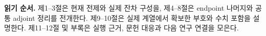 \documentclass[11pt,a4paper]{article}
\theoremstyle{definition}\newtheorem{definition}{정의}
\begin{document}
\noindent{}
\newpage
\begingroup\small\setlength{\parskip}{0pt}
\tableofcontents
\vspace{3mm}
\noindent\textbf{읽기 순서.} 제1--3절은 현재 전제와 실제 잔차 구성을, 제4--8절은 endpoint 나머지와 공통 adjoint 정리를 전개한다. 제9--10절은 실제 계열에서 확보한 부호와 수치 포함을 설명한다. 제11--12절 및 부록은 실행 근거, 문헌 대응과 다음 연구 연결을 모은다.
\endgroup
\newpage




\end{document}
